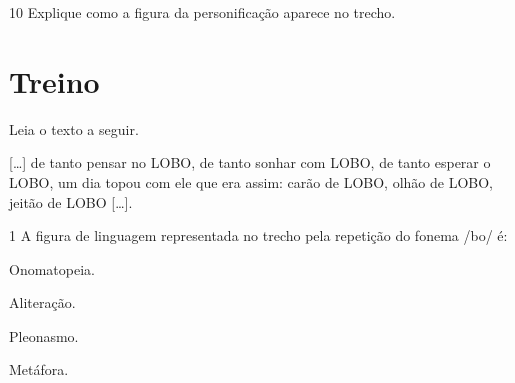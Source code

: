 \num{10} Explique como a figura da personificação aparece no trecho.


\section*{Treino}

Leia o texto a seguir.

\begin{myquote}
{[}\ldots{]} de tanto pensar no LOBO, de tanto sonhar com LOBO, de tanto
esperar o LOBO, um dia topou com ele que era assim: carão de LOBO, olhão
de LOBO, jeitão de LOBO {[}\ldots{]}.

\end{myquote}


\num{1} A figura de linguagem representada no trecho pela repetição do fonema
/bo/ é:

\begin{escolha}
\item Onomatopeia.
\item Aliteração.
\item Pleonasmo.
\item Metáfora.
\end{escolha}



